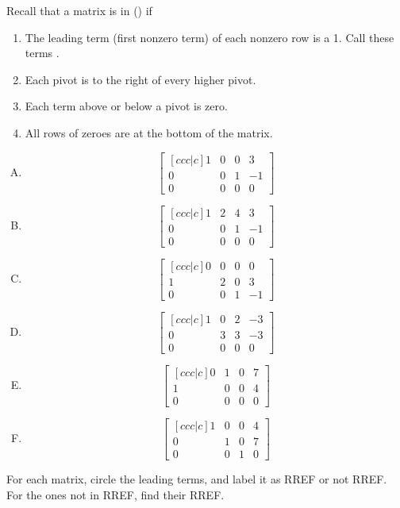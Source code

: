 \begin{activity}{15}
Recall that a matrix is in  () if
\begin{enumerate}
\item The leading term (first nonzero term) of each nonzero row is a 1.
      Call these terms .
\item Each pivot is to the right of every higher pivot.
\item Each term above or below a pivot is zero.
\item All rows of zeroes are at the bottom of the matrix.
\end{enumerate}
\vfill

\begin{multicols}{3}
\begin{enumerate}[(A)]
\item \[ \begin{bmatrix}[ccc|c] 1 & 0 & 0 & 3 \\ 0 & 0 & 1 & -1 \\ 0 & 0 & 0 & 0 \end{bmatrix}\]
\item \[ \begin{bmatrix}[ccc|c] 1 & 2 & 4 & 3 \\ 0 & 0 & 1 & -1 \\ 0 & 0 & 0 & 0 \end{bmatrix}\]
\item \[ \begin{bmatrix}[ccc|c] 0 & 0 & 0 & 0 \\ 1 & 2 & 0 & 3 \\ 0 & 0 & 1 & -1  \end{bmatrix}\]
\item \[ \begin{bmatrix}[ccc|c] 1 & 0 & 2 & -3 \\ 0 & 3 & 3 & -3 \\ 0 & 0 & 0 & 0 \end{bmatrix}\]
\item \[ \begin{bmatrix}[ccc|c] 0 & 1 & 0 & 7 \\ 1 & 0 & 0 & 4 \\ 0 & 0 & 0 & 0 \end{bmatrix}\]
\item \[ \begin{bmatrix}[ccc|c] 1 & 0 & 0 & 4 \\ 0 & 1 & 0 & 7 \\ 0 & 0 & 1 & 0 \end{bmatrix}\]
\end{enumerate}
\end{multicols}
For each matrix, circle the leading terms, and label it as RREF or not RREF.
For the ones not in RREF, find their RREF.
\end{activity}

